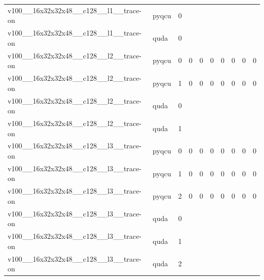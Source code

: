 \begin{table}[htbp]
\begin{tabular}{@{}llrrrrrrrr@{}}
v100\_\_16x32x32x48\_\_c128\_\_l1\_\_trace-on & pyqcu & 0 &  &  &  &  &  &  &  \\
v100\_\_16x32x32x48\_\_c128\_\_l1\_\_trace-on & quda & 0 &  &  &  &  &  &  &  \\
v100\_\_16x32x32x48\_\_c128\_\_l2\_\_trace-on & pyqcu & 0 & 0 & 0 & 0 & 0 & 0 & 0 & 0 \\
v100\_\_16x32x32x48\_\_c128\_\_l2\_\_trace-on & pyqcu & 1 & 0 & 0 & 0 & 0 & 0 & 0 & 0 \\
v100\_\_16x32x32x48\_\_c128\_\_l2\_\_trace-on & quda & 0 &  &  &  &  &  &  &  \\
v100\_\_16x32x32x48\_\_c128\_\_l2\_\_trace-on & quda & 1 &  &  &  &  &  &  &  \\
v100\_\_16x32x32x48\_\_c128\_\_l3\_\_trace-on & pyqcu & 0 & 0 & 0 & 0 & 0 & 0 & 0 & 0 \\
v100\_\_16x32x32x48\_\_c128\_\_l3\_\_trace-on & pyqcu & 1 & 0 & 0 & 0 & 0 & 0 & 0 & 0 \\
v100\_\_16x32x32x48\_\_c128\_\_l3\_\_trace-on & pyqcu & 2 & 0 & 0 & 0 & 0 & 0 & 0 & 0 \\
v100\_\_16x32x32x48\_\_c128\_\_l3\_\_trace-on & quda & 0 &  &  &  &  &  &  &  \\
v100\_\_16x32x32x48\_\_c128\_\_l3\_\_trace-on & quda & 1 &  &  &  &  &  &  &  \\
v100\_\_16x32x32x48\_\_c128\_\_l3\_\_trace-on & quda & 2 &  &  &  &  &  &  &  \\
\bottomrule
\end{tabular}
\end{table}

